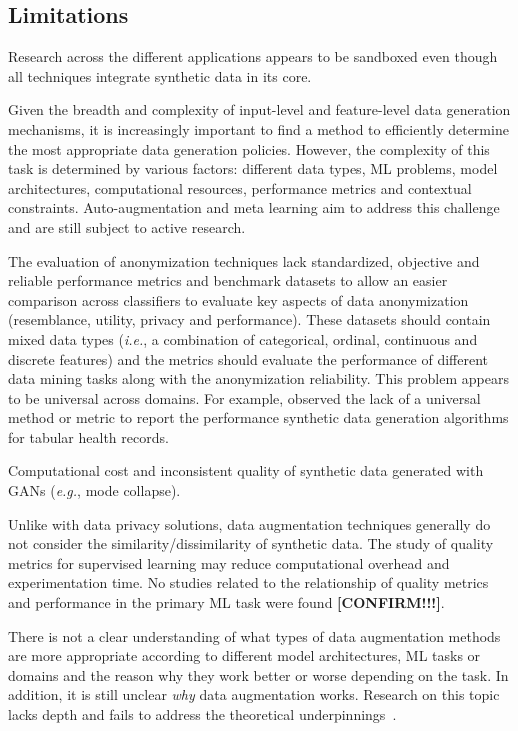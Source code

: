 \documentclass[parskip=full]{scrartcl}
\begin{document}
\subsection{Limitations}

Research across the different applications appears to be sandboxed even though
all techniques integrate synthetic data in its core.

Given the breadth and complexity of input-level and feature-level data
generation mechanisms, it is increasingly important to find a method to
efficiently determine the most appropriate data generation policies. However,
the complexity of this task is determined by various factors: different data
types, ML problems, model architectures, computational resources, performance
metrics and contextual constraints. Auto-augmentation and meta learning aim to
address this challenge and are still subject to active research.


The evaluation of anonymization techniques lack standardized, objective and
reliable performance metrics and benchmark datasets to allow an easier
comparison across classifiers to evaluate key aspects of data anonymization
(resemblance, utility, privacy and performance). These datasets should contain
mixed data types (\textit{i.e.}, a combination of categorical, ordinal,
continuous and discrete features) and the metrics should evaluate the
performance of different data mining tasks along with the anonymization
reliability. This problem appears to be universal across domains. For example,
\citet{hernandez2022synthetic} observed the lack of a universal method or metric
to report the performance synthetic data generation algorithms for tabular
health records.

Computational cost and inconsistent quality of synthetic data generated with
GANs (\textit{e.g.}, mode collapse).

Unlike with data privacy solutions, data augmentation techniques generally do
not consider the similarity/dissimilarity of synthetic data. The study of
quality metrics for supervised learning may reduce computational overhead and
experimentation time. No studies related to the relationship of quality
metrics and performance in the primary ML task were found
\textbf{[CONFIRM!!!]}.

There is not a clear understanding of what types of data augmentation methods
are more appropriate according to different model architectures, ML tasks or
domains and the reason why they work better or worse depending on the task. 
In addition, it is still unclear \textit{why} data augmentation works.
Research on this topic lacks depth and fails to address the theoretical
underpinnings~\cite{feng2021survey}.
\end{document}
